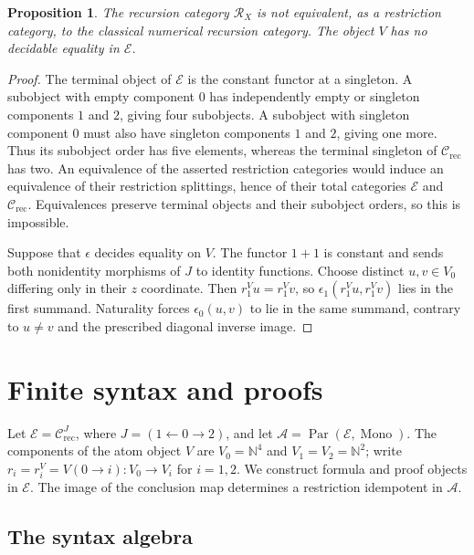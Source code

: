 \documentclass[11pt]{article}
\newtheorem{proposition}[theorem]{Proposition}
\newcommand{\N}{\mathbb N}
\begin{document}
\begin{proposition}\label{prop:fork-distinction}
The recursion category $\mathscr R_X$ is not equivalent, as a
restriction category, to the classical numerical recursion category.
The object $V$ has no decidable equality in $\mathcal E$.
\end{proposition}
\begin{proof}
The terminal object of $\mathcal E$ is the constant functor at a singleton.
A subobject with empty component $0$ has independently empty or
singleton components $1$ and $2$, giving four subobjects. A
subobject with singleton component $0$ must also have singleton
components $1$ and $2$, giving one more. Thus its subobject order has five elements, whereas
the terminal singleton of $\mathcal C_{\mathrm{rec}}$ has two.
An equivalence of the asserted restriction categories would induce
an equivalence of their restriction splittings, hence of their
total categories $\mathcal E$ and $\mathcal C_{\mathrm{rec}}$.
Equivalences preserve terminal objects and their subobject orders,
so this is impossible.

Suppose that $\epsilon$ decides equality on $V$. The functor $1+1$
is constant and sends both nonidentity morphisms of $J$ to
identity functions. Choose distinct $u,v\in V_0$ differing only
in their $z$ coordinate. Then $r_1^Vu=r_1^Vv$, so
$\epsilon_1(r_1^Vu,r_1^Vv)$ lies in the first summand.
Naturality forces $\epsilon_0(u,v)$ to lie in the same summand,
contrary to $u\ne v$ and the prescribed diagonal inverse image.
\end{proof}

\section{Finite syntax and proofs}
\label{app:fork-proofs}

Let $\mathcal E=\mathcal C_{\mathrm{rec}}^{J}$, where
$J=(1\leftarrow0\to2)$, and let
$\mathcal A=\operatorname{Par}(\mathcal E,\operatorname{Mono})$.
The components of the atom object $V$ are $V_0=\N^4$ and
$V_1=V_2=\N^2$; write $r_i=r_i^V=V(0\to i):V_0\to V_i$
for $i=1,2$.
We construct formula and proof objects in $\mathcal E$. The image of
the conclusion map determines a restriction idempotent in $\mathcal A$.

\subsection{The syntax algebra}
\end{document}
